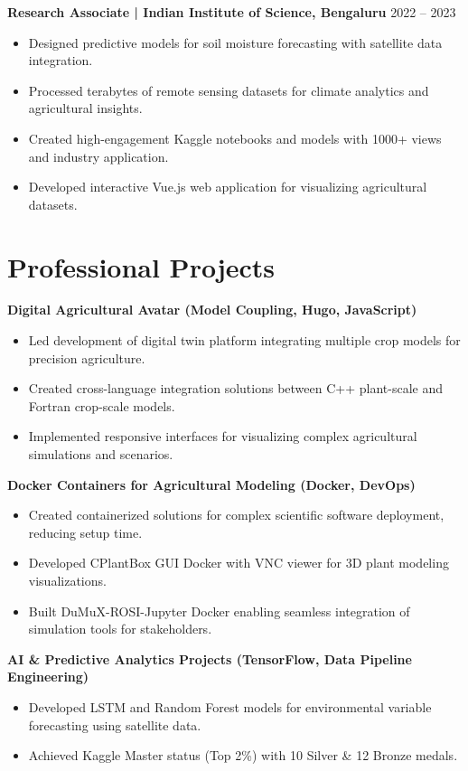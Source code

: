 \documentclass[11pt,a4paper]{article}
\begin{document}
\textbf{Research Associate | Indian Institute of Science, Bengaluru} \hfill 2022 – 2023  
\begin{itemize}[leftmargin=*]
    \item Designed predictive models for soil moisture forecasting with satellite data integration.
    \item Processed terabytes of remote sensing datasets for climate analytics and agricultural insights.
    \item Created high-engagement Kaggle notebooks and models with 1000+ views and industry application.
    \item Developed interactive Vue.js web application for visualizing agricultural datasets.
\end{itemize}

\newpage

\section*{Professional Projects}

\textbf{Digital Agricultural Avatar (Model Coupling, Hugo, JavaScript)}
\begin{itemize}[leftmargin=*]
    \item Led development of digital twin platform integrating multiple crop models for precision agriculture.
    \item Created cross-language integration solutions between C++ plant-scale and Fortran crop-scale models.
    \item Implemented responsive interfaces for visualizing complex agricultural simulations and scenarios.
\end{itemize}

\textbf{Docker Containers for Agricultural Modeling (Docker, DevOps)}
\begin{itemize}[leftmargin=*]
    \item Created containerized solutions for complex scientific software deployment, reducing setup time.
    \item Developed CPlantBox GUI Docker with VNC viewer for 3D plant modeling visualizations.
    \item Built DuMuX-ROSI-Jupyter Docker enabling seamless integration of simulation tools for stakeholders.
\end{itemize}

\textbf{AI \& Predictive Analytics Projects (TensorFlow, Data Pipeline Engineering)}
\begin{itemize}[leftmargin=*]
    \item Developed LSTM and Random Forest models for environmental variable forecasting using satellite data.
    \item Achieved Kaggle Master status (Top 2\%) with 10 Silver \& 12 Bronze medals.
\end{itemize}
\end{document}
